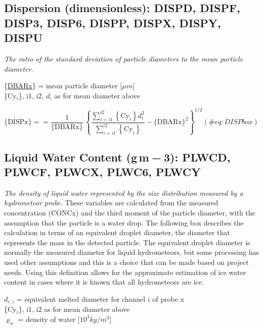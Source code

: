 \documentclass[
  english,
]{book}
\begin{document}
\hypertarget{dispersion}{%
\subsection*{Dispersion (dimensionless): DISPD, DISPF, DISP3, DISP6,
DISPP, DISPX, DISPY, DISPU}\label{dispersion}}

\emph{The ratio of the standard deviation of particle diameters to the
mean particle diameter.}

\{\protect\hyperlink{mean-diameter}{DBARx}\} = mean particle diameter
{[}\(\mu m\){]}\\
\{Cy\(_{i}\)\}, i1, i2, \(d_{i}\) as for mean diameter above

\begin{equation}
\mathrm{\{DISPx\}}==\frac{1}{\{\mathrm{DBARx}\}}\,\left\{ \frac{{\textstyle \sum_{i=i1}^{i2}}{\displaystyle {\displaystyle \left\{ \mathrm{Cy}_{i}\right\} d_{i}^{2}}}}{\sum_{i=i1}^{i2}\left\{ \mathrm{Cy}_{i}\right\} }-\{\mathrm{DBARx}\}^{2}\right\} ^{1/2}
(\#eq:DISPbox)
\end{equation}

\hypertarget{PSD-LWC}{%
\subsection*{\texorpdfstring{Liquid Water Content (g m{ − 3}): PLWCD,
PLWCF, PLWCX, PLWC6,
PLWCY}{Liquid Water Content (g m − 3): PLWCD, PLWCF, PLWCX, PLWC6, PLWCY}}\label{PSD-LWC}}

\emph{The density of liquid water represented by the size distribution
measured by a hydrometeor probe.} These variables are calculated from
the measured concentration (CONCx) and the third moment of the particle
diameter, with the assumption that the particle is a water drop. The
following box describes the calculation in terms of an equivalent
droplet diameter, the diameter that represents the mass in the detected
particle. The equivalent droplet diameter is normally the measured
diameter for liquid hydrometeors, but some processing has used other
assumptions and this is a choice that can be made based on project
needs. Using this definition allows for the approximate estimation of
ice water content in cases where it is known that all hydrometeors are
ice.

\(d_{e,i}\) = equivalent melted diameter for channel \(i\) of probe
x\\
\{Cy\(_{i}\)\}, i1, i2 as for mean diameter above\\
\(\varrho_{w}\) =
density of water {[}\(10^{3}kg/m^{3}\){]}
\end{document}
